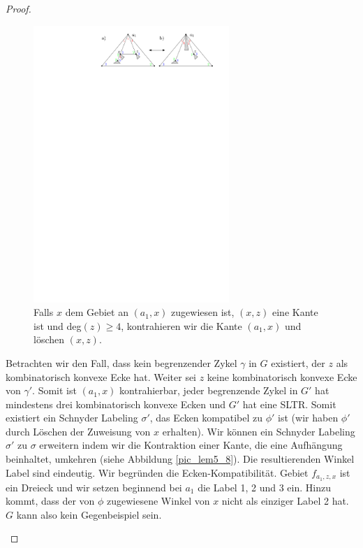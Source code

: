 \begin{proof}
\begin{description}[leftmargin =0pt, font = \rmfamily ]
\begin{figure}[h]
	\centering
	  \includegraphics[width=0.66\textwidth]{lem5_7.pdf}
    	\caption{Falls $x$ dem Gebiet an $(a_1,x)$ zugewiesen ist, $(x,z)$ eine Kante ist und deg$(z)\geq 4$, kontrahieren wir die Kante $(a_1,x)$ und löschen $(x,z)$.}
    	\label{pic_lem5_7}
\end{figure}

Betrachten wir den Fall, dass kein begrenzender Zykel $\gamma$ in $G$ existiert, der $z$ als kombinatorisch konvexe Ecke hat. Weiter sei $z$ keine kombinatorisch konvexe Ecke von $\gamma'$. Somit ist $(a_1,x)$ kontrahierbar, jeder begrenzende Zykel in $G'$ hat mindestens drei kombinatorisch konvexe Ecken und $G'$ hat eine SLTR. Somit existiert ein Schnyder Labeling $\sigma'$, das Ecken kompatibel zu $\phi'$ ist (wir haben $\phi'$ durch Löschen der Zuweisung von $x$ erhalten). Wir können ein Schnyder Labeling $\sigma'$ zu $\sigma$ erweitern indem wir die Kontraktion einer Kante, die eine Aufhängung beinhaltet, umkehren (siehe Abbildung \ref{pic_lem5_8}). Die resultierenden Winkel Label sind eindeutig. Wir begründen die Ecken-Kompatibilität. Gebiet $f_{a_1,z,x}$ ist ein Dreieck und wir setzen beginnend bei $a_1$ die Label 1, 2 und 3 ein. Hinzu kommt, dass der von $\phi$ zugewiesene Winkel von $x$ nicht als einziger Label 2 hat. $G$ kann also kein Gegenbeispiel sein.


\end{description}
\end{proof}
